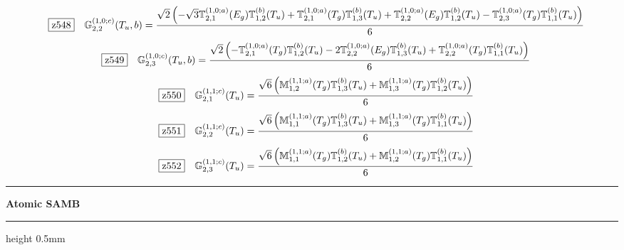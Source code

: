 \documentclass[fleqn,10pt,landscape]{jsarticle}
\begin{document}
\begin{dmath*}
\hspace*{3mm}\fbox{z548}\quad \mathbb{G}_{2,2}^{(1,0;c)}(T_{u},b)=\frac{\sqrt{2} \left(- \sqrt{3} \mathbb{T}_{2,1}^{(1,0;a)}(E_{g}) \mathbb{T}_{1,2}^{(b)}(T_{u}) + \mathbb{T}_{2,1}^{(1,0;a)}(T_{g}) \mathbb{T}_{1,3}^{(b)}(T_{u}) + \mathbb{T}_{2,2}^{(1,0;a)}(E_{g}) \mathbb{T}_{1,2}^{(b)}(T_{u}) - \mathbb{T}_{2,3}^{(1,0;a)}(T_{g}) \mathbb{T}_{1,1}^{(b)}(T_{u})\right)}{6}
\end{dmath*}
\begin{dmath*}
\hspace*{3mm}\fbox{z549}\quad \mathbb{G}_{2,3}^{(1,0;c)}(T_{u},b)=\frac{\sqrt{2} \left(- \mathbb{T}_{2,1}^{(1,0;a)}(T_{g}) \mathbb{T}_{1,2}^{(b)}(T_{u}) - 2 \mathbb{T}_{2,2}^{(1,0;a)}(E_{g}) \mathbb{T}_{1,3}^{(b)}(T_{u}) + \mathbb{T}_{2,2}^{(1,0;a)}(T_{g}) \mathbb{T}_{1,1}^{(b)}(T_{u})\right)}{6}
\end{dmath*}
\begin{dmath*}
\hspace*{3mm}\fbox{z550}\quad \mathbb{G}_{2,1}^{(1,1;c)}(T_{u})=\frac{\sqrt{6} \left(\mathbb{M}_{1,2}^{(1,1;a)}(T_{g}) \mathbb{T}_{1,3}^{(b)}(T_{u}) + \mathbb{M}_{1,3}^{(1,1;a)}(T_{g}) \mathbb{T}_{1,2}^{(b)}(T_{u})\right)}{6}
\end{dmath*}
\begin{dmath*}
\hspace*{3mm}\fbox{z551}\quad \mathbb{G}_{2,2}^{(1,1;c)}(T_{u})=\frac{\sqrt{6} \left(\mathbb{M}_{1,1}^{(1,1;a)}(T_{g}) \mathbb{T}_{1,3}^{(b)}(T_{u}) + \mathbb{M}_{1,3}^{(1,1;a)}(T_{g}) \mathbb{T}_{1,1}^{(b)}(T_{u})\right)}{6}
\end{dmath*}
\begin{dmath*}
\hspace*{3mm}\fbox{z552}\quad \mathbb{G}_{2,3}^{(1,1;c)}(T_{u})=\frac{\sqrt{6} \left(\mathbb{M}_{1,1}^{(1,1;a)}(T_{g}) \mathbb{T}_{1,2}^{(b)}(T_{u}) + \mathbb{M}_{1,2}^{(1,1;a)}(T_{g}) \mathbb{T}_{1,1}^{(b)}(T_{u})\right)}{6}
\end{dmath*}
\vspace{5mm}

\vspace{5mm}
\noindent \rule[0.5mm]{5mm}{0.5mm}\hspace{3mm}\textbf{Atomic SAMB}\hspace{3mm}\leaders\hrule height 0.5mm\hfill\kern0pt
\vspace{3mm}

\vspace{5mm}
\end{document}

